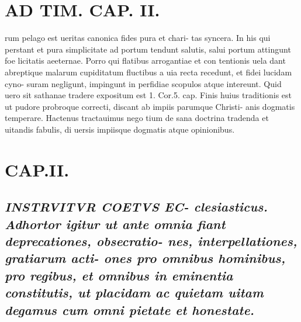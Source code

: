 \documentclass{article}
\begin{document}
\begin{pages}
\section*{AD TIM. CAP. II. }
\marginpar{[ p.108 ]}\pstart rum pelago est ueritas canonica fides pura et chari- tas syncera. In his qui perstant et pura simplicitate ad portum tendunt salutis, salui portum attingunt foe licitatis aeeternae. Porro qui flatibus arrogantiae et con tentionis uela dant abreptique malarum cupiditatum fluctibus a uia recta recedunt, et fidei lucidam cyno- suram negligunt, impingunt in perfidiae scopulos atque  intereunt. Quid uero sit sathanae tradere expositum est 1. Cor.5. cap. Finis huius traditionis est ut pudore probroque correcti, discant ab impiis parumque Christi- anis dogmatis temperare. Hactenus tractauimus nego tium de sana doctrina tradenda et uitandis fabulis, di uersis impiisque dogmatis atque opinionibus.  \pend
\endnumbering\beginnumbering\section{CAP.II.}
{}
\subsection*{\textit{INSTRVITVR COETVS EC- clesiasticus. Adhortor igitur ut ante omnia fiant deprecationes, obsecratio- nes, interpellationes, gratiarum acti- ones pro omnibus hominibus, pro regibus, et omnibus in eminentia constitutis, ut placidam ac quietam uitam degamus cum omni pietate et honestate. }}

\end{pages}
\end{document}
